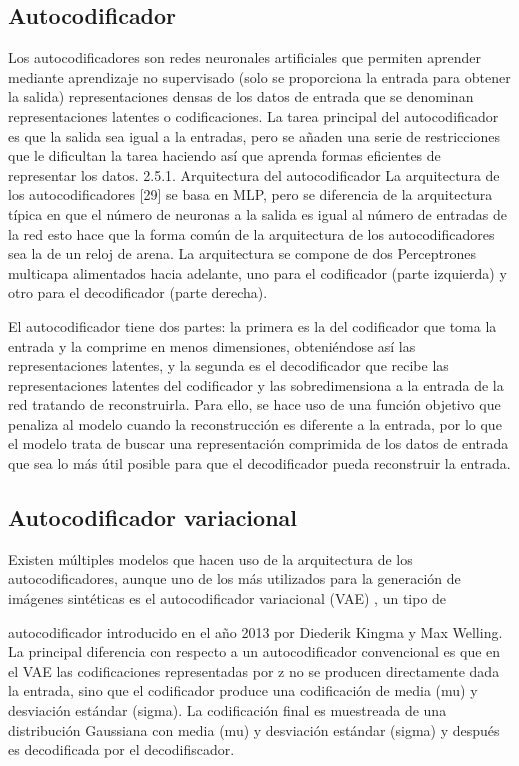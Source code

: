 \subsection{Autocodificador}\label{sec:autocodificador}
Los autocodificadores son redes neuronales artificiales que permiten aprender
mediante aprendizaje no supervisado (solo se proporciona la entrada para
obtener la salida) representaciones densas de los datos de entrada que se
denominan representaciones latentes o codificaciones. La tarea principal del
autocodificador es que la salida sea igual a la entradas, pero se añaden una
serie de restricciones que le dificultan la tarea haciendo así que aprenda formas
eficientes de representar los datos.
2.5.1. Arquitectura del autocodificador
La arquitectura de los autocodificadores [29] se basa en MLP, pero se diferencia
de la arquitectura típica en que el número de neuronas a la salida es igual al
número de entradas de la red esto hace que la forma común de la arquitectura
de los autocodificadores sea la de un reloj de arena.
La arquitectura se compone de dos
Perceptrones multicapa alimentados hacia adelante, uno para el codificador
(parte izquierda) y otro para el decodificador (parte derecha).

El autocodificador tiene dos partes: la primera es la del codificador que toma la
entrada y la comprime en menos dimensiones, obteniéndose así las
representaciones latentes, y la segunda es el decodificador que recibe las
representaciones latentes del codificador y las sobredimensiona a la entrada de
la red tratando de reconstruirla. Para ello, se hace uso de una función objetivo
que penaliza al modelo cuando la reconstrucción es diferente a la entrada, por
lo que el modelo trata de buscar una representación comprimida de los datos
de entrada que sea lo más útil posible para que el decodificador pueda
reconstruir la entrada.
\subsection{Autocodificador variacional}\label{sec:autocodificador variacional}
Existen múltiples modelos que hacen uso de la arquitectura de los
autocodificadores, aunque uno de los más utilizados para la generación de
imágenes sintéticas es el autocodificador variacional (VAE) , un tipo de

autocodificador introducido en el año 2013 por Diederik Kingma y Max Welling.
La principal diferencia con respecto a un autocodificador convencional es que
en el VAE las codificaciones representadas por z no se producen directamente
dada la entrada, sino que el codificador produce una codificación de media (mu) y
desviación estándar (sigma). La codificación final es muestreada de una distribución
Gaussiana con media (mu) y desviación estándar (sigma) y después es decodificada por
el decodifiscador.
